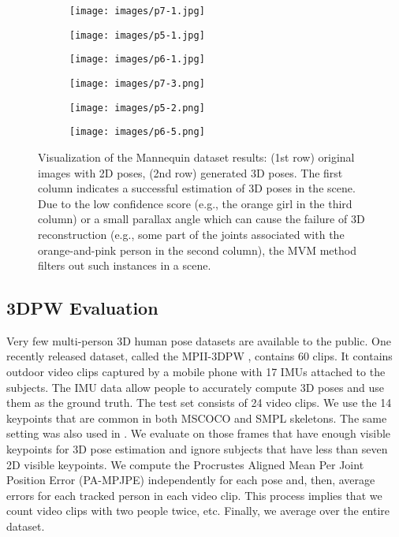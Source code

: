 \documentclass{article}
\begin{document}
\begin{figure}[h]
\centering
\begin{subfigure}[b]{0.32\textwidth}
\texttt{[image: images/p7-1.jpg]}
\end{subfigure}
\begin{subfigure}[b]{0.33\textwidth}
\texttt{[image: images/p5-1.jpg]}
\end{subfigure}
\begin{subfigure}[b]{0.33\textwidth}
\texttt{[image: images/p6-1.jpg]}
\end{subfigure}
\begin{subfigure}[b]{0.32\textwidth}
\texttt{[image: images/p7-3.png]}
\end{subfigure}
\begin{subfigure}[b]{0.33\textwidth}
\texttt{[image: images/p5-2.png]}
\end{subfigure}
\begin{subfigure}[b]{0.33\textwidth}
\texttt{[image: images/p6-5.png]}
\end{subfigure}
\caption{Visualization of the Mannequin dataset results: (1st row)
original images with 2D poses, (2nd row) generated 3D poses.  The first
column indicates a successful estimation of 3D poses in the scene. Due
to the low confidence score (e.g., the orange girl in the third column)
or a small parallax angle which can cause the failure of 3D
reconstruction (e.g., some part of the joints associated with the
orange-and-pink person in the second column), the MVM method
filters out such instances in a scene.} \label{fig:eval}
\end{figure}


\subsection{3DPW Evaluation}

Very few multi-person 3D human pose datasets are available to the
public.  One recently released dataset, called the MPII-3DPW
\cite{von2018recovering}, contains 60 clips. It contains outdoor video
clips captured by a mobile phone with 17 IMUs attached to the subjects. The IMU data allow people to accurately
compute 3D poses and use them as the ground truth.  The test set
consists of 24 video clips. We use the 14 keypoints that are common in
both MSCOCO and SMPL skeletons. The same setting was also used in
\cite{arnab2019exploiting}. We evaluate on those frames that have enough
visible keypoints for 3D pose estimation and ignore subjects that have
less than seven 2D visible keypoints. We compute the Procrustes Aligned
Mean Per Joint Position Error (PA-MPJPE) \cite{arnab2019exploiting}
independently for each pose and, then, average errors for each tracked
person in each video clip. This process implies that we count video
clips with two people twice, etc. Finally, we average over the entire
dataset. 
\end{document}
